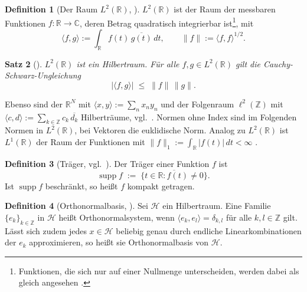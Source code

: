 \documentclass[a4paper,11pt,bibliography=totoc,listof=totoc,headinclude=true,cleardoublepage=empty,oneside]{scrbook}
\theoremstyle{plain}
\newtheorem{Satz}{Satz}[chapter]
\theoremstyle{definition}
\newtheorem{Definition}[Satz]{Definition}
\newcommand{\R}{\mathbb{R}}
\newcommand{\Z}{\mathbb{Z}}
\newcommand{\C}{\mathbb{C}}
\newcommand{\LZwei}{L^2(\R)}
\newcommand{\ellZwei}{\ell^2(\Z)}
\newcommand{\scal}[2]{\langle #1, #2 \rangle}
\newcommand{\norm}[1]{\lVert #1 \rVert}
\newcommand{\abs}[1]{\lvert #1 \rvert}
\DeclareMathOperator{\supp}{supp}
\begin{document}
\begin{Definition}[Der Raum $\LZwei$, {\cite[Kap.~25]{serov}}] %
\label{def:l2}
$\LZwei$ ist der Raum der messbaren Funktionen $f\colon\R\to\C$, deren Betrag
quadratisch integrierbar ist\footnote{Funktionen, die sich nur auf einer
Nullmenge unterscheiden, werden dabei als gleich angesehen
\cite[Kap.~2.1--2.2]{blatter}.}, %
mit
\[
  \scal{f}{g} := \int_\R f(t)\,\overline{g(t)}\,dt ,
  \qquad
  \norm{f} := \scal{f}{f}^{1/2} .
\]
\end{Definition}

\begin{Satz}[{\cite[Kap.~25, Übung~25.3]{serov}}] %
\label{satz:l2-hilbert}
$\LZwei$ ist ein Hilbertraum. Für alle $f,g\in\LZwei$ gilt die
Cauchy-Schwarz-Ungleichung
\[
  \abs{\scal{f}{g}} \;\le\; \norm{f}\,\norm{g} .
\]
\end{Satz}

Ebenso sind der $\R^N$ mit $\scal{x}{y} := \sum_{n} x_n y_n$ und der Folgenraum
$\ellZwei$ mit $\scal{c}{d} := \sum_{k\in\Z} c_k\,\overline{d_k}$ Hilberträume,
vgl.\ \cite[Kap.~25]{serov}. %
Normen ohne Index sind im Folgenden Normen in $\LZwei$, bei Vektoren die
euklidische Norm. Analog zu $\LZwei$ ist $L^1(\R)$ der Raum der Funktionen mit
$\norm{f}_1 := \int_\R \abs{f(t)}\,dt < \infty$ \cite[Kap.~2.2]{blatter}. %

\begin{Definition}[Träger, vgl.\ {\cite[Def.~56.1]{hankebourgeois}}] %
\label{def:traeger}
Der Träger einer Funktion $f$ ist
\[
  \supp f \;:=\; \overline{\{t\in\R : f(t)\neq 0\}} .
\]
Ist $\supp f$ beschränkt, so hei\ss t $f$ kompakt getragen.
\end{Definition}

\begin{Definition}[Orthonormalbasis, {\cite[Def.~25.4, Def.~25.17]{serov}}] %
\label{def:onb}
Sei $\mathcal H$ ein Hilbertraum. Eine Familie $\{e_k\}_{k\in\Z}$ in
$\mathcal H$ hei\ss t Orthonormalsystem, wenn $\scal{e_k}{e_l} = \delta_{k,l}$
für alle $k,l\in\Z$ gilt. Lässt sich zudem jedes $x\in\mathcal H$ beliebig
genau durch endliche Linearkombinationen der $e_k$ approximieren, so hei\ss t
sie Orthonormalbasis von $\mathcal H$.
\end{Definition}
\end{document}
